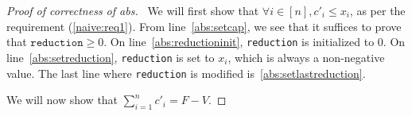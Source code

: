 \begin{proof}[Proof of correctness of abs] \
  We will first show that $\forall i \in [n], c'_i \leq x_i$, as per the requirement (\ref{naive:req1}). From
  line~\ref{abs:setcap}, we see that it suffices to prove that $\texttt{reduction} \geq 0$. On line~\ref{abs:reductioninit},
  \texttt{reduction} is initialized to 0. On line~\ref{abs:setreduction}, \texttt{reduction} is set to $x_i$, which is always
  a non-negative value. The last line where \texttt{reduction} is modified is~\ref{abs:setlastreduction}.

  We will now show that $\sum\limits_{i=1}^nc'_i = F - V$.
\end{proof}
